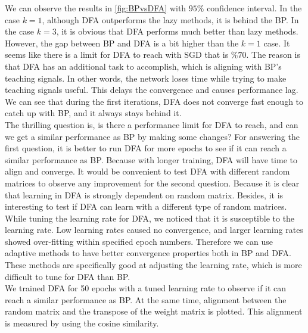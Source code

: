 \documentclass[a4paper, nobind]{templates/ociamthesis}
\begin{document}
\noindent We can observe the results in \ref{fig:BPvsDFA} with \(95\%\) confidence interval. In the case \(k=1\), although DFA outperforms the lazy methods, it is behind the BP. In the case \(k=3\), it is obvious that DFA performs much better than lazy methods. However, the gap between BP and DFA is a bit higher than the \(k=1\) case. It seems like there is a limit for DFA to reach with SGD that is \(\%70\). The reason is that DFA has an additional task to accomplish, which is aligning with BP's teaching signals. In other words, the network loses time while trying to make teaching signals useful. This delays the convergence and causes performance lag. We can see that during the first iterations, DFA does not converge fast enough to catch up with BP, and it always stays behind it.\\
The thrilling question is, is there a performance limit for DFA to reach, and can we get a similar performance as BP by making some changes? For answering the first question, it is better to run DFA for more epochs to see if it can reach a similar performance as BP. Because with longer training, DFA will have time to align and converge. It would be convenient to test DFA with different random matrices to observe any improvement for the second question. Because it is clear that learning in DFA is strongly dependent on random matrix. Besides, it is interesting to test if DFA can learn with a different type of random matrices. While tuning the learning rate for DFA, we noticed that it is susceptible to the learning rate. Low learning rates caused no convergence, and larger learning rates showed over-fitting within specified epoch numbers. Therefore we can use adaptive methods to have better convergence properties both in BP and DFA. These methods are specifically good at adjusting the learning rate, which is more difficult to tune for DFA than BP.\\
\noindent We trained DFA for 50 epochs with a tuned learning rate to observe if it can reach a similar performance as BP. At the same time, alignment between the random matrix and the transpose of the weight matrix is plotted. This alignment is measured by using the cosine similarity.
\end{document}
